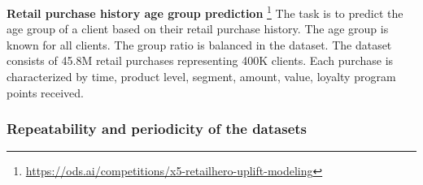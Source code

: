 \documentclass[sigconf, anonymous]{acmart}
\begin{document}
\textbf{Retail purchase history age group prediction}%
\footnote{
    \url{https://ods.ai/competitions/x5-retailhero-uplift-modeling}
}
The task is to predict the age group of a client based on their retail purchase history.
The age group is known for all clients. The group ratio is balanced in the dataset. The dataset consists
of 45.8M retail purchases representing 400K clients. Each purchase is characterized by
time, product level, segment, amount, value, loyalty program points received.



\subsubsection{Repeatability and periodicity of the datasets} \label{sec-period}
\end{document}
